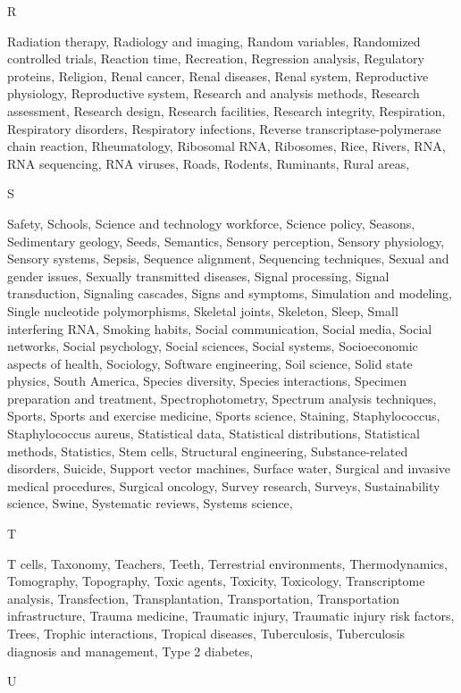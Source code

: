 R

Radiation therapy, Radiology and imaging, Random variables, Randomized controlled trials, Reaction time, Recreation, Regression analysis, Regulatory proteins, Religion, Renal cancer, Renal diseases, Renal system, Reproductive physiology, Reproductive system, Research and analysis methods, Research assessment, Research design, Research facilities, Research integrity, Respiration, Respiratory disorders, Respiratory infections, Reverse transcriptase-polymerase chain reaction, Rheumatology, Ribosomal RNA, Ribosomes, Rice, Rivers, RNA, RNA sequencing, RNA viruses, Roads, Rodents, Ruminants, Rural areas, 

S

Safety, Schools, Science and technology workforce, Science policy, Seasons, Sedimentary geology, Seeds, Semantics, Sensory perception, Sensory physiology, Sensory systems, Sepsis, Sequence alignment, Sequencing techniques, Sexual and gender issues, Sexually transmitted diseases, Signal processing, Signal transduction, Signaling cascades, Signs and symptoms, Simulation and modeling, Single nucleotide polymorphisms, Skeletal joints, Skeleton, Sleep, Small interfering RNA, Smoking habits, Social communication, Social media, Social networks, Social psychology, Social sciences, Social systems, Socioeconomic aspects of health, Sociology, Software engineering, Soil science, Solid state physics, South America, Species diversity, Species interactions, Specimen preparation and treatment, Spectrophotometry, Spectrum analysis techniques, Sports, Sports and exercise medicine, Sports science, Staining, Staphylococcus, Staphylococcus aureus, Statistical data, Statistical distributions, Statistical methods, Statistics, Stem cells, Structural engineering, Substance-related disorders, Suicide, Support vector machines, Surface water, Surgical and invasive medical procedures, Surgical oncology, Survey research, Surveys, Sustainability science, Swine, Systematic reviews, Systems science, 

T

T cells, Taxonomy, Teachers, Teeth, Terrestrial environments, Thermodynamics, Tomography, Topography, Toxic agents, Toxicity, Toxicology, Transcriptome analysis, Transfection, Transplantation, Transportation, Transportation infrastructure, Trauma medicine, Traumatic injury, Traumatic injury risk factors, Trees, Trophic interactions, Tropical diseases, Tuberculosis, Tuberculosis diagnosis and management, Type 2 diabetes, 

U


